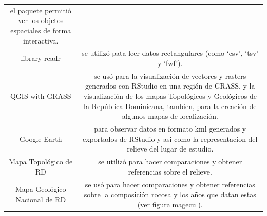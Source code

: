 \documentclass[11pt,]{article}
\begin{document}
\begin{longtable}[]{@{}cc@{}}
\begin{minipage}[t]{0.83\columnwidth}
el paquete permitió ver los objetos espaciales de forma
interactiva.\strut
\end{minipage}\tabularnewline
\begin{minipage}[t]{0.11\columnwidth}\centering\strut
library readr\strut
\end{minipage} & \begin{minipage}[t]{0.83\columnwidth}\centering\strut
se utilizó pata leer datos rectangulares (como `csv', `tsv' y
`fwf').\strut
\end{minipage}\tabularnewline
\begin{minipage}[t]{0.11\columnwidth}\centering\strut
QGIS with GRASS\strut
\end{minipage} & \begin{minipage}[t]{0.83\columnwidth}\centering\strut
se usó para la visualización de vectores y rasters generados con RStudio
en una región de GRASS, y la visualización de los mapas Topológicos y
Geológicos de la República Dominicana, tambien, para la creación de
algunos mapas de localización.\strut
\end{minipage}\tabularnewline
\begin{minipage}[t]{0.11\columnwidth}\centering\strut
Google Earth\strut
\end{minipage} & \begin{minipage}[t]{0.83\columnwidth}\centering\strut
para observar datos en formato kml generados y exportados de RStudio y
asi como la representacion del relieve del lugar de estudio.\strut
\end{minipage}\tabularnewline
\begin{minipage}[t]{0.11\columnwidth}\centering\strut
Mapa Topológico de RD\strut
\end{minipage} & \begin{minipage}[t]{0.83\columnwidth}\centering\strut
se utilizó para hacer comparaciones y obtener referencias sobre el
relieve.\strut
\end{minipage}\tabularnewline
\begin{minipage}[t]{0.11\columnwidth}\centering\strut
Mapa Geológico Nacional de RD\strut
\end{minipage} & \begin{minipage}[t]{0.83\columnwidth}\centering\strut
se usó para hacer comparaciones y obtener referencias sobre la
composición rocosa y los años que datan estas (ver
figura\ref{magecu}).\strut
\end{minipage}\tabularnewline
\bottomrule
\end{longtable}
\end{document}
